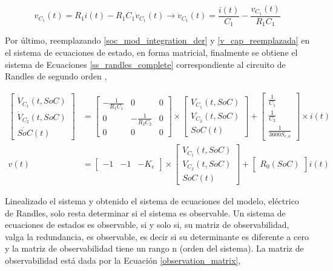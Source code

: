 \documentclass[10pt,a4paper]{article}
\newcounter{subsubsubsection}[subsubsection]
\begin{document}
\begin{equation}
    v_{C_1}(t) = R_1i(t) - R_1C_1\dot{v}_{C_1}(t) \rightarrow 
    \dot{v}_{C_1}(t) = \frac{i(t)}{C_1} -
    \frac{v_{C_1}(t)}{R_1C_1}\label{v_cap_reemplazada}
\end{equation}

Por \'ultimo, reemplazando \ref{soc_mod_integration_der} y
\ref{v_cap_reemplazada} en el sistema de ecuaciones de estado, en forma
matricial, finalmente se obtiene el sistema de Ecuaciones 
\ref{ss_randles_complete} correspondiente al circuito de Randles de segundo
orden ,

\begin{align}
    \begin{bmatrix}
        \dot{V}_{C_1}(t, SoC) \\ \dot{V}_{C_2}(t, SoC) \\ \dot{SoC}(t)
    \end{bmatrix} &= 
    \begin{bmatrix}
        -\frac{1}{R_1C_1} & 0 & 0\\
        0 & -\frac{1}{R_2C_2} & 0\\
        0 & 0 & 0
    \end{bmatrix}
    \times\begin{bmatrix}V_{C_1}(t, SoC) \\ V_{C_2}(t, SoC) \\ SoC(t)\end{bmatrix}
    +
    \begin{bmatrix}
        \frac{1}{C_1} \\ \frac{1}{C_2} \\ \frac{1}{3600S_{c,a}}
    \end{bmatrix}
    \times i(t)\nonumber \\
    v(t) &= \begin{bmatrix} -1 & -1 & -K_e \end{bmatrix} \times 
    \begin{bmatrix} V_{C_1}(t, SoC) \\ V_{C_2}(t, SoC) \\ SoC(t) \end{bmatrix} +
    \begin{bmatrix} R_0(SoC) \end{bmatrix} i(t)\label{ss_randles_complete}
\end{align}

\newpage


Linealizado el sistema y obtenido el sistema de ecuaciones del modelo,
el\'ectrico de Randles, solo resta determinar si el sistema es observable. Un
sistema de ecuaciones de estados es observable, si y solo si, su matriz de
observabilidad, valga la redundancia, es observable, es decir si su determinante 
es diferente a cero y la matriz de observabilidad tiene un rango n 
(orden del sistema). La matriz de observabilidad est\'a dada por la Ecuaci\'on 
\ref{observation_matrix},
\end{document}

